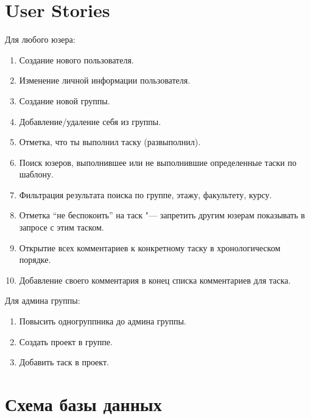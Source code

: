 \documentclass[12pt,a4paper,notitlepage]{article}
\begin{document}
\section{User Stories}
Для любого юзера:
\begin{enumerate}
\item Создание нового пользователя.
\item Изменение личной информации пользователя.
\item Создание новой группы.
\item Добавление/удаление себя из группы.
\item Отметка, что ты выполнил таску (развыполнил).
\item Поиск юзеров, выполнившее или не выполнившие определенные таски по шаблону.
\item Фильтрация результата поиска по группе, этажу, факультету, курсу.
\item Отметка ``не беспокоить'' на таск "--- запретить другим юзерам показывать в запросе с этим таском.
\item Открытие всех комментариев к конкретному таску в хронологическом порядке.
\item Добавление своего комментария в конец списка комментариев для таска.
\end{enumerate}
\newpage
Для админа группы:
\begin{enumerate}
\item Повысить одногруппника до админа группы.
\item Создать проект в группе.
\item Добавить таск в проект.
\end{enumerate}

\section{Схема базы данных}
\end{document}
